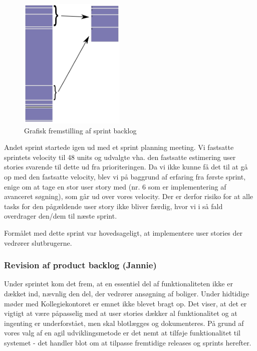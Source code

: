 \documentclass[12pt, a4paper]{report}
\begin{document}
\begin{figure}
\begin{center}
\includegraphics[width=0.45\textwidth]{sprint2log}
\end{center}
\caption{Grafisk fremstilling af sprint backlog}
\label{sprintlog2}
\end{figure}

Andet sprint startede igen ud med et sprint planning meeting. Vi fastsatte sprintets velocity til 48 units og udvalgte vha. den fastsatte estimering user stories svarende til dette ud fra prioriteringen. Da vi ikke kunne få det til at gå op med den fastsatte velocity, blev vi på baggrund af erfaring fra første sprint, enige om at tage en stor user story med (nr. 6 som er implementering af avanceret søgning), som går ud over vores velocity. Der er derfor risiko for at alle tasks for den pågældende user story ikke bliver færdig, hvor vi i så fald overdrager den/dem til næste sprint.

Formålet med dette sprint var hovedsageligt, at implementere user stories der vedrører slutbrugerne.

\subsubsection{Revision af product backlog (Jannie)}

Under sprintet kom det frem, at en essentiel del af funktionaliteten ikke er dækket ind, nævnlig den del, der vedrører ansøgning af boliger. Under hidtidige møder med Kollegiekontoret er emnet ikke blevet bragt op. Det viser, at det er vigtigt at være påpasselig med at user stories dækker al funktionalitet og at ingenting er underforstået, men skal blotlægges og dokumenteres. På grund af vores valg af en agil udviklingsmetode er det nemt at tilføje funktionalitet til systemet - det handler blot om at tilpasse fremtidige releases og sprints herefter.
\end{document}
